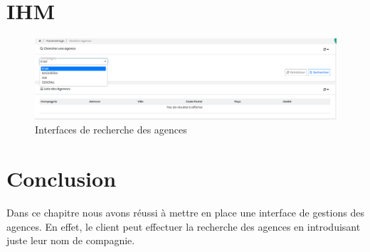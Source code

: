 \section{IHM}
\begin{figure}[H]
\centering
\includegraphics[width=1.05\columnwidth,height=0.45
\columnwidth]{images/interface1.PNG}
\caption{Interfaces de recherche des agences}
\label{fig:Diagramme de cas d'utilisation sprint 1}
\end{figure}





\section*{Conclusion}
Dans ce chapitre nous avons réussi à mettre en place une interface de gestions des agences. En effet, le client peut effectuer la recherche des agences en introduisant juste leur nom de compagnie.